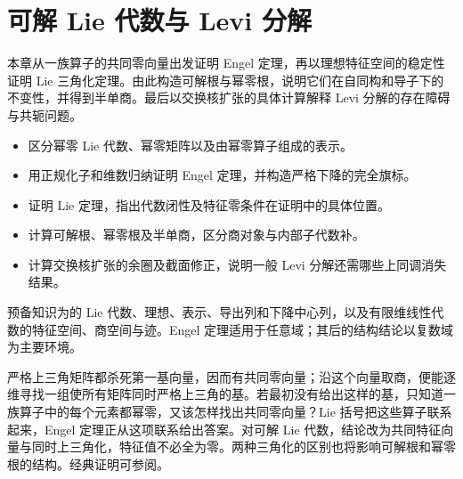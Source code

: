
\chapter{可解 Lie 代数与 Levi 分解}
\label{b5:ch:12}

\begin{chapterabstract}
	本章从一族算子的共同零向量出发证明 Engel 定理，再以理想特征空间的稳定性证明 Lie 三角化定理。由此构造可解根与幂零根，说明它们在自同构和导子下的不变性，并得到半单商。最后以交换核扩张的具体计算解释 Levi 分解的存在障碍与共轭问题。
\end{chapterabstract}

\begin{learninggoals}
	\begin{itemize}
		\item 区分幂零 Lie 代数、幂零矩阵以及由幂零算子组成的表示。
		\item 用正规化子和维数归纳证明 Engel 定理，并构造严格下降的完全旗标。
		\item 证明 Lie 定理，指出代数闭性及特征零条件在证明中的具体位置。
		\item 计算可解根、幂零根及半单商，区分商对象与内部子代数补。
		\item 计算交换核扩张的余圈及截面修正，说明一般 Levi 分解还需哪些上同调消失结果。
	\end{itemize}
	预备知识为的 Lie 代数、理想、表示、导出列和下降中心列，以及有限维线性代数的特征空间、商空间与迹。Engel 定理适用于任意域；其后的结构结论以复数域为主要环境。
\end{learninggoals}

严格上三角矩阵都杀死第一基向量，因而有共同零向量；沿这个向量取商，便能逐维寻找一组使所有矩阵同时严格上三角的基。若最初没有给出这样的基，只知道一族算子中的每个元素都幂零，又该怎样找出共同零向量？Lie 括号把这些算子联系起来，Engel 定理正从这项联系给出答案。对可解 Lie 代数，结论改为共同特征向量与同时上三角化，特征值不必全为零。两种三角化的区别也将影响可解根和幂零根的结构。经典证明可参阅\cite[Sections 3.3 and 4.1, pp.~12--13, 15--16]{Humphreys1972LieAlgebras}。







